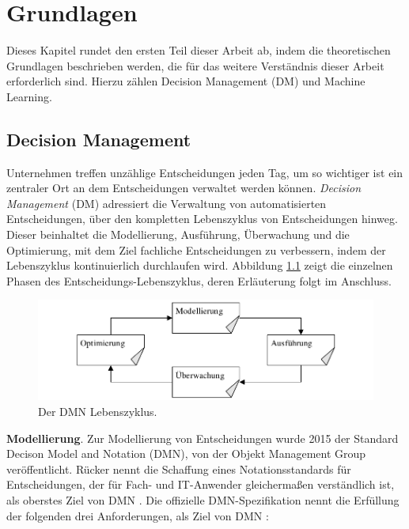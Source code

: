 \chapter{Grundlagen}
\label{ch:Grundlagen2}

Dieses Kapitel rundet den ersten Teil dieser Arbeit ab, indem die theoretischen Grundlagen beschrieben werden, die für das weitere Verständnis dieser Arbeit erforderlich sind. Hierzu zählen Decision Management (DM) und Machine Learning. 

\section{Decision Management}
\label{sec:Decision_Management2}

Unternehmen treffen unzählige Entscheidungen jeden Tag, um so wichtiger ist ein zentraler Ort an dem Entscheidungen verwaltet werden können. \emph{Decision Management} (DM) adressiert die Verwaltung von automatisierten Entscheidungen, über den kompletten Lebenszyklus von Entscheidungen hinweg. Dieser beinhaltet die Modellierung, Ausführung, Überwachung und die Optimierung, mit dem Ziel fachliche Entscheidungen zu verbessern, indem der Lebenszyklus kontinuierlich durchlaufen wird. Abbildung \ref{fig:lifecycle} zeigt die einzelnen Phasen des Entscheidungs-Lebenszyklus, deren Erläuterung folgt im Anschluss.  

\begin{figure}[ht]
\centering
\includegraphics{images/lifecycle.pdf}
\caption{Der DMN Lebenszyklus.}
\label{fig:lifecycle}
\end{figure}

\textbf{Modellierung}. Zur Modellierung von Entscheidungen wurde 2015 der Standard Decison Model and Notation (DMN), von der Objekt Management Group veröffentlicht. Rücker nennt die Schaffung eines Notationsstandards für Entscheidungen, der für Fach- und IT-Anwender gleichermaßen verständlich ist, als oberstes Ziel von DMN \cite[vgl. S. 40]{BR16}.  Die offizielle DMN-Spezifikation nennt die Erfüllung der folgenden drei Anforderungen, als Ziel von DMN \cite[vgl. S. 18 ff.]{OM16}: 

